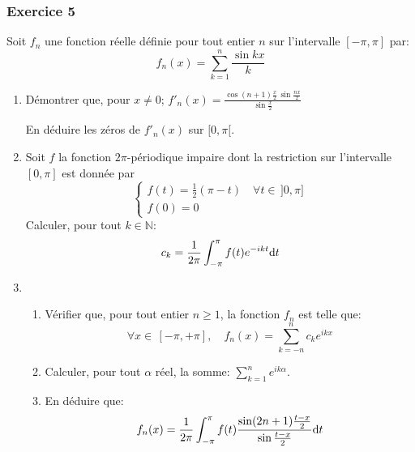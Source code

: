 \documentclass{article}
\def \de {{\rm d}}
\begin{document}
\subsubsection*{Exercice 5}
Soit $f_n$ une fonction réelle définie pour tout entier $n$ sur l'intervalle $[-\pi,\pi]$ par:
\[f_n(x)=\sum_{k=1}^n\frac {\sin kx}k\]
\begin{enumerate}

\item  Démontrer que, pour $x\neq 0$; $f'_n(x)=\frac{\cos(n+1)\frac x2\,\sin\frac{nx}{2}}{\sin\frac x2}$

En déduire les zéros de $f'_n(x)$ sur $[0,\pi[$.

\item Soit $f$ la fonction $2\pi$-périodique impaire dont la restriction sur l'intervalle $[0,\pi]$ est donnée par
\[\left\{\begin{array}{l}
f(t)=\frac 12(\pi-t)\quad \forall t\in\,]0,\pi]\\
f(0)=0
\end{array}\right.\]
 Calculer, pour tout $k\in\mathbb{N}$:
\[c_k=\frac{1}{2\pi}\int_{-\pi}^{\pi}f(t)e^{-ikt}\de t\]

\item \begin{enumerate}
\item Vérifier que, pour tout entier $n\geq 1$, la fonction $f_n$  est telle que:
\[\forall x\in\,[-\pi,+\pi],\quad f_n(x)=\sum_{k=-n}^{n}c_k e^{ikx}\]
\item Calculer, pour tout $\alpha$ réel, la somme: $\sum_{k=1}^ne^{ ik\alpha}$.

\item En déduire que:
\[f_n(x)=\frac{1}{2\pi}\int_{-\pi}^\pi f(t)\frac{\sin(2n+1)\frac{t-x}2}{\sin\frac{t-x}2}\de t\]

\end{enumerate}
\end{enumerate}
\end{document}
